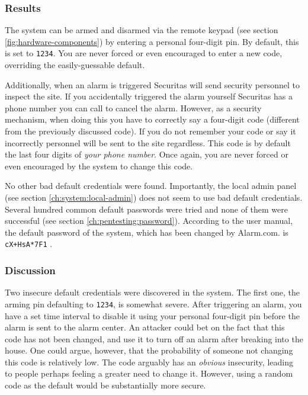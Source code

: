 \subsubsection{Results}
The system can be armed and disarmed via the remote keypad (see section \ref{fig:hardware-components}) by entering a personal four-digit pin. By default, this is set to \texttt{1234}. You are never forced or even encouraged to enter a new code, overriding the easily-guessable default.

Additionally, when an alarm is triggered Securitas will send security personnel to inspect the site. If you accidentally triggered the alarm yourself Securitas has a phone number you can call to cancel the alarm. However, as a security mechanism, when doing this you have to correctly say a four-digit code (different from the previously discussed code). If you do not remember your code or say it incorrectly personnel will be sent to the site regardless. This code is by default the last four digits of \textit{your phone number}. Once again, you are never forced or even encouraged by the system to change this code.

No other bad default credentials were found. Importantly, the local admin panel (see section \ref{ch:system:local-admin}) does not seem to use bad default credentials. Several hundred common default passwords were tried and none of them were successful (see section \ref{ch:pentesting:password}). According to the user manual, the default password of the system, which has been changed by Alarm.com. is \texttt{cX+HsA*7F1} \cite{hsgw-user-manual}.

\subsubsection{Discussion}
Two insecure default credentials were discovered in the system. The first one, the arming pin defaulting to \texttt{1234}, is somewhat severe. After triggering an alarm, you have a set time interval to disable it using your personal four-digit pin before the alarm is sent to the alarm center. An attacker could bet on the fact that this code has not been changed, and use it to turn off an alarm after breaking into the house. One could argue, however, that the probability of someone not changing this code is relatively low. The code arguably has an \textit{obvious} insecurity, leading to people perhaps feeling a greater need to change it. However, using a random code as the default would be substantially more secure.

